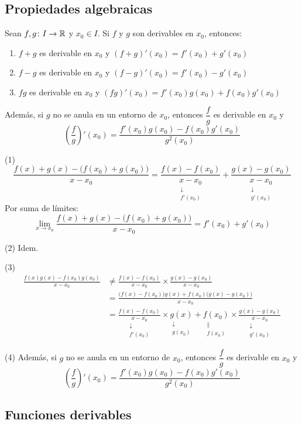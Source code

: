 \documentclass[11pt,a4paper]{article}
\newcommand{\abajo}[3][]{\underset{\substack{\downarrow\,#1\\ #3}}{#2}}
\begin{document}
\subsection{Propiedades algebraicas}

\begin{proposicion}
  Sean $f,g\colon I\to\mathbb{R}$ y $x_0\in I$. Si $f$ y $g$ son derivables en
  $x_0$, entonces:
  \begin{enumerate}[label=(\arabic*)]
    \item $f+g$ es derivable en $x_0$ y $(f+g)'(x_0)=f'(x_0)+g'(x_0)$
    \item $f-g$ es derivable en $x_0$ y $(f-g)'(x_0)=f'(x_0)-g'(x_0)$
    \item $fg$ es derivable en $x_0$ y
      $(fg)'(x_0)=f'(x_0)g(x_0)+f(x_0)g'(x_0)$
  \end{enumerate}
  Además, si $g$ no se anula en un entorno de $x_0$, entonces
  $\dfrac{f}{g}$ es derivable en $x_0$ y
  \[
    \left(\frac{f}{g}\right)'(x_0)
    =\frac{f'(x_0)g(x_0)-f(x_0)g'(x_0)}{g^2(x_0)}
  \]
\end{proposicion}

\begin{demo}
  (1)
  \[
    \frac{f(x)+g(x)-\bigl(f(x_0)+g(x_0)\bigr)}{x-x_0}
    =\abajo{\frac{f(x)-f(x_0)}{x-x_0}}{f'(x_0)}
    +\abajo{\frac{g(x)-g(x_0)}{x-x_0}}{g'(x_0)}
  \]
  Por suma de límites:
  \[
    \lim_{x\to x_0}\frac{f(x)+g(x)-\bigl(f(x_0)+g(x_0)\bigr)}{x-x_0}
    =f'(x_0)+g'(x_0)
  \]

  (2) Idem.

  (3)
  \begin{align*}
    \frac{f(x)g(x)-f(x_0)g(x_0)}{x-x_0}
    &\neq\frac{f(x)-f(x_0)}{x-x_0}\times\frac{g(x)-g(x_0)}{x-x_0}\\
    &=\frac{\bigl(f(x)-f(x_0)\bigr)g(x)+f(x_0)\bigl(g(x)-g(x_0)\bigr)}{x-x_0}\\
    &=\abajo{\frac{f(x)-f(x_0)}{x-x_0}}{f'(x_0)}
      \times\abajo{g(x)}{g(x_0)}
      +\underset{\substack{\|\\ f(x_0)}}{f(x_0)}
      \times\abajo{\frac{g(x)-g(x_0)}{x-x_0}}{g'(x_0)}
  \end{align*}
\end{demo}

(4) Además, si $g$ no se anula en un entorno de $x_0$, entonces
$\dfrac{f}{g}$ es derivable en $x_0$ y
\[
  \left(\frac{f}{g}\right)'(x_0)
  =\frac{f'(x_0)g(x_0)-f(x_0)g'(x_0)}{g^2(x_0)}
\]

\subsection{Funciones derivables}
\end{document}
